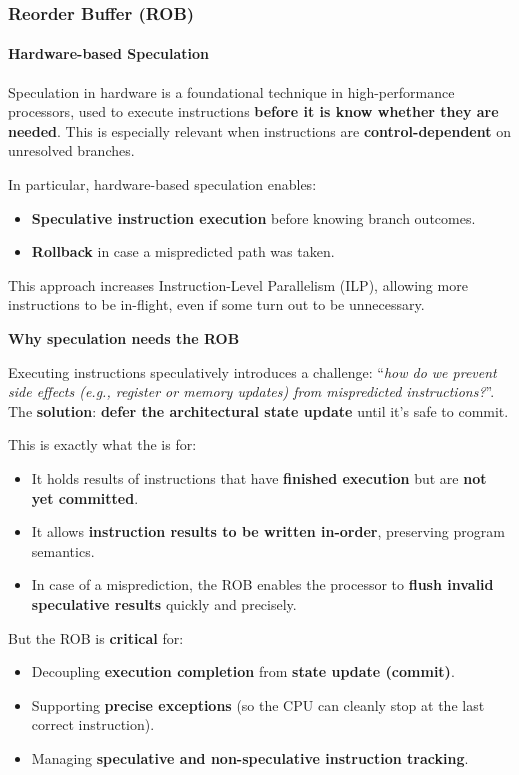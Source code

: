 \subsubsection{Reorder Buffer (ROB)}\label{subsubsection: Reorder Buffer - ROB}

\paragraph{Hardware-based Speculation}

Speculation in hardware is a foundational technique in high-performance processors, used to execute instructions \textbf{before it is know whether they are needed}. This is especially relevant when instructions are \textbf{control-dependent} on unresolved branches.

\highspace
In particular, hardware-based speculation enables:
\begin{itemize}
    \item \textbf{Speculative instruction execution} before knowing branch outcomes.
    \item \textbf{Rollback} in case a mispredicted path was taken.
\end{itemize}
This approach increases Instruction-Level Parallelism (ILP), allowing more instructions to be in-flight, even if some turn out to be unnecessary.

\highspace
\begin{flushleft}
    \textcolor{Green3}{ \textbf{Why speculation needs the ROB}}
\end{flushleft}
Executing instructions speculatively introduces a challenge: ``\emph{how do we prevent side effects (e.g., register or memory updates) from mispredicted instructions?}''. The \textbf{solution}: \textbf{defer the architectural state update} until it's safe to commit.

\highspace
This is exactly what the  is for:
\begin{itemize}[label=\textcolor{Green3}{}]
    \item It holds results of instructions that have \textbf{finished execution} but are \textbf{not yet committed}.
    \item It allows \textbf{instruction results to be written in-order}, preserving program semantics.
    \item In case of a misprediction, the ROB enables the processor to \textbf{flush invalid speculative results} quickly and precisely.
\end{itemize}
But the ROB is \textbf{critical} for:
\begin{itemize}[label=\textcolor{Red2}{}]
    \item Decoupling \textbf{execution completion} from \textbf{state update (commit)}.
    \item Supporting \textbf{precise exceptions} (so the CPU can cleanly stop at the last correct instruction).
    \item Managing \textbf{speculative and non-speculative instruction tracking}.
\end{itemize}